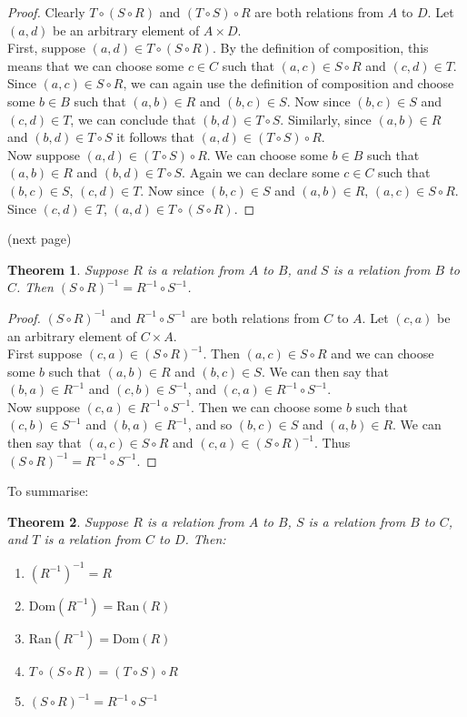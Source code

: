 \documentclass{report}
\newtheorem*{theorem}{Theorem}
\theoremstyle{definition}
\begin{document}
\begin{proof}
Clearly $T\circ(S\circ R)$ and $(T\circ S)\circ R$ are both relations from $A$ to $D$. Let $(a,d)$ be an arbitrary element of $A\times D$.\\
\indent First, suppose $(a,d)\in T\circ(S\circ R)$. By the definition of composition, this means that we can choose some $c\in C$ such that $(a,c)\in S\circ R$ and $(c,d)\in T$.
Since $(a,c)\in S\circ R$, we can again use the definition of composition and choose some $b\in B$ such that $(a,b)\in R$ and $(b,c)\in S$. Now since $(b,c)\in S$ and $(c,d)\in T$, we can conclude
that $(b,d)\in T\circ S$. Similarly, since $(a,b)\in R$ and $(b,d)\in T\circ S$ it follows that
$(a,d)\in(T\circ S)\circ R$.\\
\indent Now suppose $(a,d)\in(T\circ S)\circ R$. We can choose some $b\in B$ such that $(a,b)\in R$ and $(b,d)\in T\circ S$. Again we can declare some $c\in C$ such that $(b,c)\in S$, $(c,d)\in T$.
Now since $(b,c)\in S$ and $(a,b)\in R$, $(a,c)\in S\circ R$. Since $(c,d)\in T$, $(a,d)\in T\circ(S\circ R)$.
\end{proof}
\noindent(next page)\newpage
\begin{theorem}
Suppose $R$ is a relation from $A$ to $B$, and $S$ is a relation from $B$ to $C$. Then $(S\circ R)^{-1}=R^{-1}\circ S^{-1}$.
\end{theorem}
\begin{proof}
$(S\circ R)^{-1}$ and $R^{-1}\circ S^{-1}$ are both relations from $C$ to $A$. Let $(c,a)$ be an arbitrary element of $C\times A$.\\
\indent First suppose $(c,a)\in(S\circ R)^{-1}$. Then $(a,c)\in S\circ R$ and we can choose some $b$ such that $(a,b)\in R$ and $(b,c)\in S$. We can then say that $(b,a)\in R^{-1}$ and 
$(c,b)\in S^{-1}$, and $(c,a)\in R^{-1}\circ S^{-1}$.\\
\indent Now suppose $(c,a)\in R^{-1}\circ S^{-1}$. Then we can choose some $b$ such that $(c,b)\in S^{-1}$ and $(b,a)\in R^{-1}$, and so $(b,c)\in S$ and $(a,b)\in R$.
We can then say that $(a,c)\in S\circ R$ and $(c,a)\in(S\circ R)^{-1}$. Thus $(S\circ R)^{-1}=R^{-1}\circ S^{-1}$.
\end{proof}
\noindent To summarise:
\begin{theorem}
Suppose $R$ is a relation from $A$ to $B$, $S$ is a relation from $B$ to $C$, and $T$ is a relation from $C$ to $D$. Then:
\begin{enumerate}
\item$(R^{-1})^{-1}=R$
\item$\text{Dom}(R^{-1})=\text{Ran}(R)$
\item$\text{Ran}(R^{-1})=\text{Dom}(R)$
\item$T\circ(S\circ R)=(T\circ S)\circ R$
\item$(S\circ R)^{-1}=R^{-1}\circ S^{-1}$
\end{enumerate}
\end{theorem}
\newpage
\end{document}
